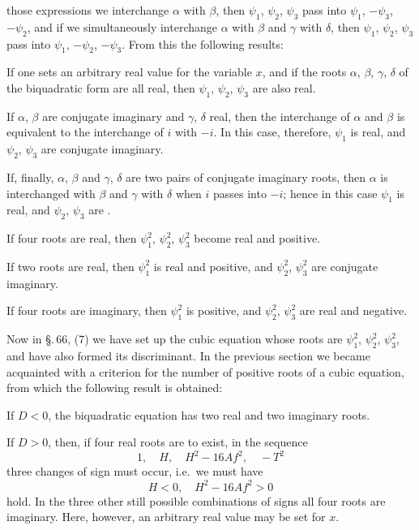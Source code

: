 those expressions we interchange $\alpha$ with $\beta$, then $\psi_1$, $\psi_2$, $\psi_3$ pass into $\psi_1$, $-\psi_3$, $-\psi_2$, and if we simultaneously interchange $\alpha$ with $\beta$ and $\gamma$ with $\delta$, then $\psi_1$, $\psi_2$, $\psi_3$ pass into $\psi_1$, $-\psi_2$, $-\psi_3$. From this the following results:

If one sets an arbitrary real value for the variable $x$, and if the roots $\alpha$, $\beta$, $\gamma$, $\delta$ of the biquadratic form are all real, then $\psi_1$, $\psi_2$, $\psi_3$ are also real.

If $\alpha$, $\beta$ are conjugate imaginary and $\gamma$, $\delta$ real, then the interchange of $\alpha$ and $\beta$ is equivalent to the interchange of $i$ with $-i$. In this case, therefore, $\psi_1$ is real, and $\psi_2$, $\psi_3$ are conjugate imaginary.

If, finally, $\alpha$, $\beta$ and $\gamma$, $\delta$ are two pairs of conjugate imaginary roots, then $\alpha$ is interchanged with $\beta$ and $\gamma$ with $\delta$ when $i$ passes into $-i$; hence in this case $\psi_1$ is real, and $\psi_2$, $\psi_3$ are .

If four roots are real, then $\psi_1^2$, $\psi_2^2$, $\psi_3^2$ become real and positive.

If two roots are real, then $\psi_1^2$ is real and positive, and $\psi_2^2$, $\psi_3^2$ are conjugate imaginary.

If four roots are imaginary, then $\psi_1^2$ is positive, and $\psi_2^2$, $\psi_3^2$ are real and negative.

Now in \S.\,66, (7) we have set up the cubic equation whose roots are $\psi_1^2$, $\psi_2^2$, $\psi_3^2$, and have also formed its discriminant. In the previous section we became acquainted with a criterion for the number of positive roots of a cubic equation, from which the following result is obtained:

If $D < 0$, the biquadratic equation has two real and two imaginary roots.

If $D > 0$, then, if four real roots are to exist, in the sequence
\[
1, \quad H, \quad H^2 - 16 A f^2, \quad -T^2
\]
three changes of sign must occur, i.e.\ we must have
\[
H < 0, \quad H^2 - 16 A f^2 > 0
\]
hold. In the three other still possible combinations of signs all four roots are imaginary. Here, however, an arbitrary real value may be set for $x$.
